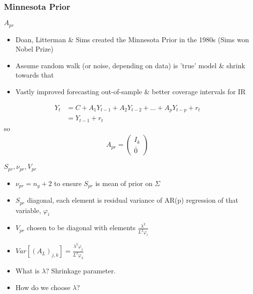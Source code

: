 \documentclass{beamer}
\begin{document}
\subsubsection*{Minnesota Prior}
\begin{frame}{$A_{pr}$}
\begin{itemize}
\item Doan, Litterman \& Sims created the Minnesota Prior in the 1980s (Sims won Nobel Prize)
\item Assume random walk (or noise, depending on data) is 'true' model \& shrink towards that
\item Vastly improved forecasting out-of-sample \& better coverage intervals for IR
\end{itemize}
\begin{align*}
Y_t &= C + A_{1}Y_{t-1} + A_{2}Y_{t-2} + \dots + A_{p}Y_{t-p} + r_t \\
&=  Y_{t-1}  + r_t
\end{align*}
so
\begin{align*}
A_{pr} = \begin{pmatrix} I_k\\ \bar{0} \end{pmatrix}
\end{align*} 
\end{frame}

\begin{frame}{$S_{pr},\nu_{pr},V_{pr}$}
\begin{itemize}
\item $\nu_{pr} = n_y+2$ to ensure $S_{pr}$ is mean of prior on $\Sigma$
\item $S_{pr}$ diagonal, each element is residual variance of AR(p) regression of that variable, $\varphi_i$
\item $V_{pr}$ chosen to be diagonal with elements  $\frac{\lambda^2}{L^2 \varphi_i}$
\item  $Var\left[(A_L)_{j,k} \right]  = \frac{\lambda^2 \varphi_{j}}{L^2 \varphi_{k}}$
\item What is $\lambda$? Shrinkage parameter.
\item How do we choose $\lambda$?
\end{itemize}
\end{frame}
\end{document}
